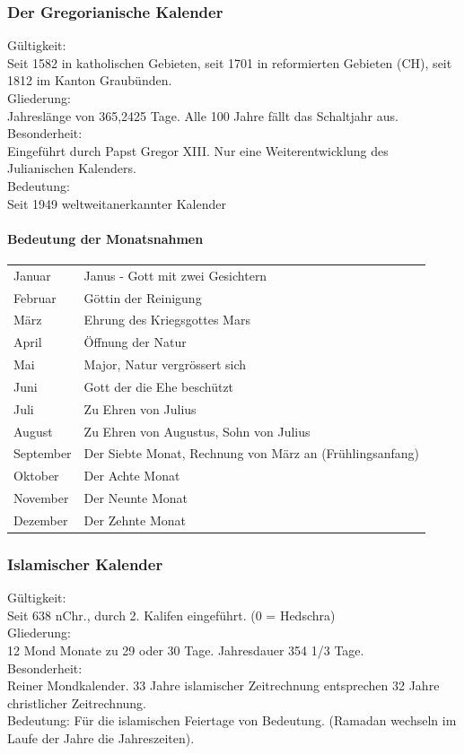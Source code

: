 \documentclass[10pt, openright=true]{scrartcl}
\begin{document}
\subsubsection{Der Gregorianische Kalender}
Gültigkeit:\\
Seit 1582 in katholischen Gebieten, seit 1701 in reformierten Gebieten (CH), seit 1812 im Kanton Graubünden.\\
Gliederung:\\
Jahreslänge von 365,2425 Tage. Alle 100 Jahre fällt das Schaltjahr aus.\\
Besonderheit:\\
Eingeführt durch Papst Gregor XIII. Nur eine Weiterentwicklung des Julianischen Kalenders.\\
Bedeutung:\\
Seit 1949 \glqq weltweit\grqq anerkannter Kalender
\paragraph{Bedeutung der Monatsnahmen}
\par
\begin{tabular}{l l}
Januar & Janus - Gott mit zwei Gesichtern\\
Februar & Göttin der Reinigung\\
März & Ehrung des Kriegsgottes Mars\\
April & Öffnung der Natur\\
Mai & Major, Natur vergrössert sich\\
Juni & Gott der die Ehe beschützt\\
Juli & Zu Ehren von Julius\\
August & Zu Ehren von Augustus, Sohn von Julius\\
September & Der Siebte Monat, Rechnung von März an (Frühlingsanfang)\\
Oktober & Der Achte Monat\\
November & Der Neunte Monat\\
Dezember & Der Zehnte Monat\\
\end{tabular}
\subsubsection{Islamischer Kalender}
Gültigkeit:\\
Seit 638 nChr., durch 2. Kalifen eingeführt. (0 = Hedschra)\\
Gliederung:\\
12 Mond Monate zu 29 oder 30 Tage. Jahresdauer 354 1/3 Tage. \\
Besonderheit:\\
Reiner Mondkalender. 33 Jahre islamischer Zeitrechnung entsprechen 32 Jahre christlicher Zeitrechnung. \\
Bedeutung: Für die islamischen Feiertage von Bedeutung. (Ramadan wechseln im Laufe der Jahre die Jahreszeiten).\\
\end{document}
